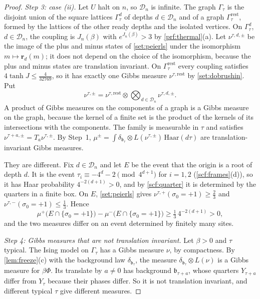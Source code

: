\begin{proof}
\emph{Step 3: case (ii).} Let $U$ halt on $n$, so $\mathcal D_n$ is infinite. The graph $\Gamma_\tau$ is the disjoint union of the square lattices $\Gamma_\tau^d$ of depths $d\in\mathcal D_n$ and of a graph $\Gamma_\tau^{\mathrm{rest}}$, formed by the lattices of the other ready depths and the isolated vertices. On $\Gamma^d_\tau$, $d\in\mathcal D_n$, the coupling is $J_n(\beta)$ with $e^{J_n(\beta)}>3$ by \cref{prf:thermal}(a). Let $\nu^{\tau,d,\pm}$ be the image of the plus and minus states of \cref{set:peierls} under the isomorphism $m\mapsto\mathbf r_d(m)$; it does not depend on the choice of the isomorphism, because the plus and minus states are translation invariant. On $\Gamma^{\mathrm{rest}}_\tau$ every coupling satisfies $4\tanh J\le\frac4{32769}$, so it has exactly one Gibbs measure $\nu^{\tau,\mathrm{rest}}$ by \cref{set:dobrushin}. Put
\[
\nu^{\tau,\pm}=\nu^{\tau,\mathrm{rest}}\otimes\bigotimes_{d\in\mathcal D_n}\nu^{\tau,d,\pm}.
\]
A product of Gibbs measures on the components of a graph is a Gibbs measure on the graph, because the kernel of a finite set is the product of the kernels of its intersections with the components. The family is measurable in $\tau$ and satisfies $\nu^{\tau+a,\pm}=T_a\nu^{\tau,\pm}$. By Step~1, $\mu^\pm=\int\delta_{\mathfrak b_\tau}\otimes L(\nu^{\tau,\pm})\,\mathrm{Haar}(d\tau)$ are translation-invariant Gibbs measures.

They are different. Fix $d\in\mathcal D_n$ and let $E$ be the event that the origin is a root of depth $d$. It is the event $\tau_i\equiv-4^d-2\pmod{4^{d+1}}$ for $i=1,2$ (\cref{scf:frames}(d)), so it has Haar probability $4^{-2(d+1)}>0$, and by \cref{scf:quarter} it is determined by the quarters in a finite box. On $E$, \cref{set:peierls} gives $\nu^{\tau,+}(\sigma_0=+1)\ge\frac23$ and $\nu^{\tau,-}(\sigma_0=+1)\le\frac13$. Hence
\[
\mu^+\bigl(E\cap\{\sigma_0=+1\}\bigr)-\mu^-\bigl(E\cap\{\sigma_0=+1\}\bigr)\ge\tfrac13\,4^{-2(d+1)}>0,
\]
and the two measures differ on an event determined by finitely many sites.

\emph{Step 4: Gibbs measures that are not translation invariant.} Let $\beta>0$ and $\tau$ typical. The Ising model on $\Gamma_\tau$ has a Gibbs measure $\nu$, by compactness. By \cref{lem:freeze}(c) with the background law $\delta_{\mathfrak b_\tau}$, the measure $\delta_{\mathfrak b_\tau}\otimes L(\nu)$ is a Gibbs measure for $\beta\Phi$. Its translate by $a\ne0$ has background $\mathfrak b_{\tau+a}$, whose quarters $Y_{\tau+a}$ differ from $Y_\tau$ because their phases differ. So it is not translation invariant, and different typical $\tau$ give different measures.
\end{proof}


